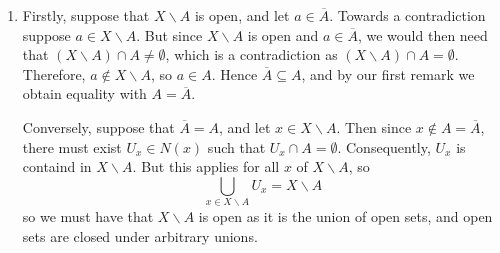 \documentclass[12pt, a4paper, twoside, openright, titlepage]{book}
\begin{document}
\begin{proof*}{}{}
\begin{enumerate}
        \item Firstly, suppose that $X\backslash A$ is open, and let $a \in \overline{A}$. Towards a contradiction suppose $a \in X\backslash A$. But since $X\backslash A$ is open and $a \in \overline{A}$, we would then need that $(X\backslash A) \cap A \neq \emptyset$, which is a contradiction as $(X\backslash A)\cap A = \emptyset$. Therefore, $a \notin X\backslash A$, so $a \in A$. Hence $\overline{A} \subseteq A$, and by our first remark we obtain equality with $A = \overline{A}$.

            Conversely, suppose that $\overline{A} = A$, and let $x \in X\backslash A$. Then since $x \notin A = \overline{A}$, there must exist $U_x \in N(x)$ such that $U_x \cap A = \emptyset$. Consequently, $U_x$ is containd in $X\backslash A$. But this applies for all $x$ of $X\backslash A$, so \begin{equation*}
                \bigcup_{x \in X\backslash A}U_x = X\backslash A
            \end{equation*}
            so we must have that $X\backslash A$ is open as it is the union of open sets, and open sets are closed under arbitrary unions.
    \end{enumerate}
\end{proof*}
\end{document}

